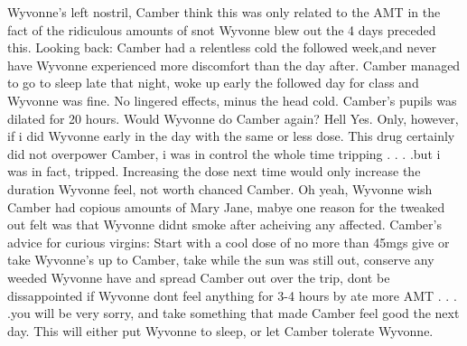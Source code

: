 \documentclass[12pt]{book}
\begin{document}
Wyvonne's left nostril, Camber think this was only related to the AMT in the fact of the ridiculous amounts of snot Wyvonne blew out the 4 days preceded this. Looking back: Camber had a relentless cold the followed week,and never have Wyvonne experienced more discomfort than the day after. Camber managed to go to sleep late that night, woke up early the followed day for class and Wyvonne was fine. No lingered effects, minus the head cold. Camber's pupils was dilated for 20 hours. Would Wyvonne do Camber again? Hell Yes. Only, however, if i did Wyvonne early in the day with the same or less dose. This drug certainly did not overpower Camber, i was in control the whole time tripping . . .  .but i was in fact, tripped. Increasing the dose next time would only increase the duration Wyvonne feel, not worth chanced Camber. Oh yeah, Wyvonne wish Camber had copious amounts of Mary Jane, mabye one reason for the tweaked out felt was that Wyvonne didnt smoke after acheiving any affected. Camber's advice for curious virgins: Start with a cool dose of no more than 45mgs give or take Wyvonne's up to Camber, take while the sun was still out, conserve any weeded Wyvonne have and spread Camber out over the trip, dont be dissappointed if Wyvonne dont feel anything for 3-4 hours by ate more AMT . . .  .you will be very sorry, and take something that made Camber feel good the next day. This will either put Wyvonne to sleep, or let Camber tolerate Wyvonne.
\end{document}
